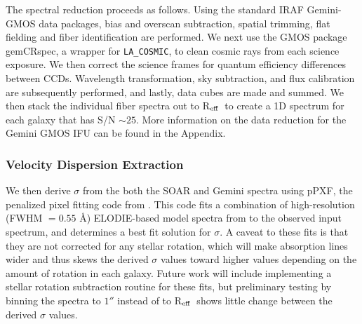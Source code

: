 \documentclass[iop,apj]{emulateapj}
\newcommand{\Reff}{R$_{\rm eff}$}
\begin{document}
The spectral reduction proceeds as follows. Using the standard IRAF Gemini-GMOS data packages, bias and overscan subtraction, spatial trimming, flat fielding and fiber identification are performed. We next use the GMOS package gemCRspec, a wrapper for \texttt{LA\_COSMIC}, to clean cosmic rays from each science exposure. We then correct the science frames for quantum efficiency differences between CCDs. Wavelength transformation, sky subtraction, and flux calibration are subsequently performed, and lastly, data cubes are made and summed. We then stack the individual fiber spectra out to \Reff\ to create a 1D spectrum for each galaxy that has S/N $\sim25$. More information on the data reduction for the Gemini GMOS IFU can be found in the Appendix.

\subsubsection{Velocity Dispersion Extraction}

\noindent We then derive $\sigma$ from the both the SOAR and Gemini spectra using {\sc pPXF}, the penalized pixel fitting code from \citet{Cappellari2004}. This code fits a combination of high-resolution (FWHM $= 0.55$ \AA) ELODIE-based model spectra from \citet{Maraston2011} to the observed input spectrum, and determines a best fit solution for $\sigma$. A caveat to these fits is that they are not corrected for any stellar rotation, which will make absorption lines wider and thus skews the derived $\sigma$ values toward higher values depending on the amount of rotation in each galaxy. Future work will include implementing a stellar rotation subtraction routine for these fits, but preliminary testing by binning the spectra to $1''$ instead of to \Reff\ shows little change between the derived $\sigma$ values.
\end{document}
